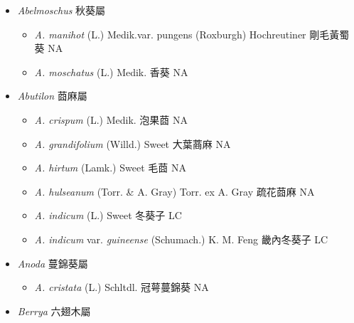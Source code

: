 
  \begin{itemize}
 \item[] \textit{Abelmoschus} 秋葵屬
                                
  \begin{itemize}
        \item[] \textit{A. manihot} (L.) Medik.var. pungens (Roxburgh) Hochreutiner  剛毛黃蜀葵   NA
        \item[] \textit{A. moschatus} (L.) Medik.  香葵   NA
  \end{itemize}
 \item[] \textit{Abutilon} 莔麻屬
                                
  \begin{itemize}
        \item[] \textit{A. crispum} (L.) Medik.  泡果莔   NA
        \item[] \textit{A. grandifolium} (Willd.) Sweet  大葉蔏麻   NA
        \item[] \textit{A. hirtum} (Lamk.) Sweet  毛莔   NA
        \item[] \textit{A. hulseanum} (Torr. \& A. Gray) Torr. ex A. Gray  疏花莔麻   NA
        \item[] \textit{A. indicum} (L.) Sweet  冬葵子   LC
        \item[] \textit{A. indicum} var. \textit{guineense} (Schumach.) K. M. Feng  畿內冬葵子   LC
  \end{itemize}
 \item[] \textit{Anoda} 蔓錦葵屬
                                
  \begin{itemize}
        \item[] \textit{A. cristata} (L.) Schltdl.  冠萼蔓錦葵   NA
  \end{itemize}
 \item[] \textit{Berrya} 六翅木屬
                                

\end{itemize}
